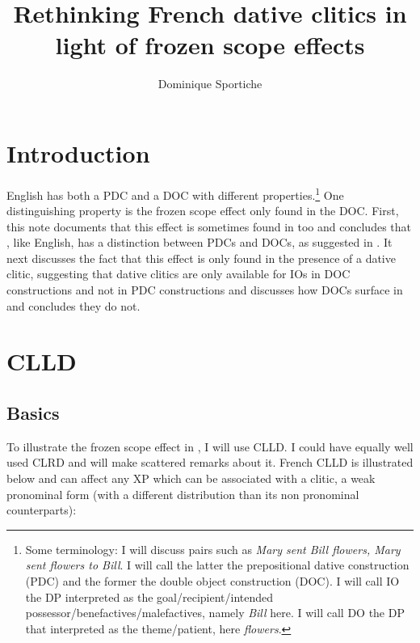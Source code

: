 \documentclass[output=paper]{langsci/langscibook}
\author{Dominique Sportiche\affiliation{University of California, Los Angeles}}
\title{Rethinking French dative clitics in light of frozen scope effects}
\begin{document}
\glsresetall
\maketitle

\section{Introduction}

English has both a \gls{PDC} and a
\gls{DOC} with different
properties.\footnote{Some terminology: I will discuss pairs such as {\it Mary
    sent Bill flowers, Mary sent flowers to Bill}.  I will call the latter the
    prepositional dative construction (\gls{PDC}) and the former the double
    object construction (\gls{DOC}). I will call \gls{IO} the DP interpreted as
    the goal\slash recipient\slash intended possessor\slash benefactives\slash malefactives, namely
{\it Bill} here. I will call \gls{DO} the DP that interpreted as the
theme/patient, here {\it flowers}.} One distinguishing property is the frozen
scope effect only found in the DOC.  First, this note documents that this
effect is sometimes found in  too and concludes that , like
English, has a distinction between \glspl{PDC} and \glspl{DOC}, as suggested in
\citet{anagnostopoulou2005cross}.  It next discusses the fact that this effect
is only found in the presence of a dative clitic, suggesting that dative
clitics are only available for \glspl{IO} in DOC constructions and not in
\gls{PDC} constructions and  discusses how \glspl{DOC} surface in  and concludes they do not.

\section{CLLD}

\subsection{Basics}\label{clld-htld}

To illustrate the frozen scope effect in , I will use \gls{CLLD}. I
could have equally well used \gls{CLRD} and will make scattered remarks about
it.  French \gls{CLLD} is illustrated below and can
affect any XP which can be associated with a clitic, a weak pronominal form
(with a different distribution than its non pronominal counterparts):
\end{document}
